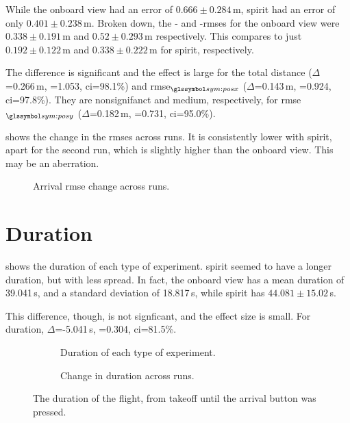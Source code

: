  While the onboard view had an error of $0.666\pm0.284$\,m, \gls{spirit} had an error of only $0.401\pm0.238$\,m.
  Broken down, the - and -\glspl{rmse} for the onboard view were $0.338\pm0.191$\,m and $0.52\pm0.293$\,m respectively.
  This compares to just $0.192\pm0.122$\,m and $0.338\pm0.222$\,m for \gls{spirit}, respectively.
  
  The difference is significant and the effect is large for the total distance ($\Delta$=0.266\,m, =1.053, \gls{ci}=98.1\%) and \gls{rmse}$_{\sym{posx}}$ ($\Delta$=0.143\,m, =0.924, \gls{ci}=97.8\%).
  They are nonsignifanct and medium, respectively, for \gls{rmse}$_{\sym{posy}}$ ($\Delta$=0.182\,m, =0.731, \gls{ci}=95.0\%).

   shows the change in the \glspl{rmse} across runs.
  It is consistently lower with \gls{spirit}, apart for the second run, which is slightly higher than the onboard view.
  This may be an aberration.

  \begin{figure}[h]
    \centering
    
    \caption[Arrival RMS Error across runs]{Arrival \gls{rmse} change across runs.}
    \label{fig:rms_runs}
  \end{figure}

  \section{Duration}
   shows the duration of each type of experiment.
  \gls{spirit} seemed to have a longer duration, but with less spread.
  In fact, the onboard view has a mean duration of 39.041\,s, and a standard deviation of 18.817\,s, while \gls{spirit} has $44.081\pm15.02$\,s.

  This difference, though, is not signficant, and the effect size is small. For duration, $\Delta$=-5.041\,s, =0.304, \gls{ci}=81.5\%.
  
  \begin{figure}[h]
    \centering
    \begin{subfigure}[b]{0.45\textwidth}
      
      \caption{Duration of each type of experiment.}
      \label{fig:duration_result}
    \end{subfigure}
    \hfill
    \begin{subfigure}[b]{0.45\textwidth}
      
      \caption{Change in duration across runs.}
      \label{fig:duration_runs}
    \end{subfigure}
    \caption[Duration]{The duration of the flight, from takeoff until the arrival button was pressed.}
    \label{fig:duration}
  \end{figure}

